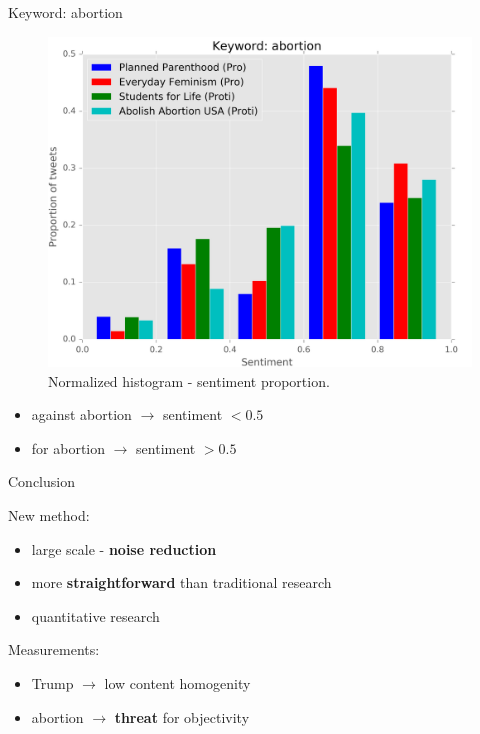 \documentclass[notheorems,12pt]{beamer}
\begin{document}
\begin{frame}{Keyword: abortion}
    \begin{figure}
        \centering
        \includegraphics[scale=0.37]{./Pics/abortion-normed.png}
        \vspace{-0.2cm}
        \caption*{Normalized histogram - sentiment proportion.}
    \end{figure}
    \vspace{-0.4cm}
	\begin{itemize}
		\item against abortion $\rightarrow$ sentiment $< 0.5$
        \item for abortion $\rightarrow$ sentiment $> 0.5$
	\end{itemize}
\end{frame}
\begin{frame}{Conclusion}
    \begin{block}{New method:}
        \begin{itemize}
            \item large scale - \textbf{noise reduction}
            \item more \textbf{straightforward} than traditional research
            \item quantitative research
        \end{itemize}
    \end{block}

    \begin{block}{Measurements:}
    	\begin{itemize}
            \item Trump $\rightarrow$ low content homogenity
            \item abortion $\rightarrow$ \textbf{threat} for objectivity
    	\end{itemize}
    \end{block}
\end{frame}
\end{document}
